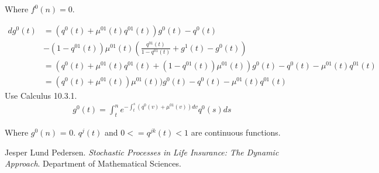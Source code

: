 \documentclass[10pt]{article}
\begin{document}
Where $f^0(n) = 0$.

\begin{equation}
\begin{split}
dg^0(t) & = (q^0(t) + 
\mu^{01}(t) q^{01}(t)) g^0(t) -q^0(t) \\
& - (1-q^{01}(t))\mu^{01}(t)(\frac{q^{01}(t)}{1-q^{01}(t)}+g^1(t)-g^0(t)) \\
& = (q^0(t) + \mu^{01}(t) q^{01}(t) + (1-q^{01}(t))\mu^{01}(t)) g^0(t) -q^0(t) - \mu^{01}(t)q^{01}(t) \\
& = (q^0(t) + \mu^{01}(t))\mu^{01}(t)) g^0(t) -q^0(t) - \mu^{01}(t)q^{01}(t) 
\end{split}
\end{equation}
Use Calculus 10.3.1.
\begin{equation}
\begin{split}
g^0(t) = \int_t^n e^{-\int_t^s(q^0(v) + \mu^{01}(v))dv} q^0(s)ds
\end{split}
\end{equation}

Where $g^0(n)$ = 0.  $q^j(t)$ and $0 <= q^{jk}(t) < 1$ are continuous functions.

\newpage

\begin{thebibliography}{9}

  Jesper Lund Pedersen.
  \textit{Stochastic Processes in Life Insurance: The Dynamic Approach}.
  Department of Mathematical Sciences.

\end{thebibliography}
\end{document}
